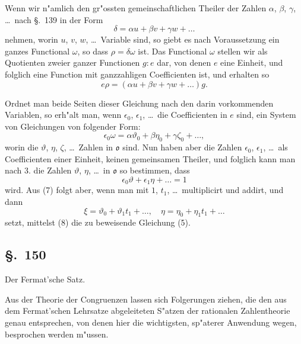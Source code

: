 \documentclass[12pt,a4paper]{article}
\theoremstyle{definition}
\begin{document}
Wenn wir n"amlich den gr"ossten gemeinschaftlichen Theiler der Zahlen $\alpha$, $\beta$, $\gamma$, \dots\ nach \S.~139 in der Form
\begin{equation}
\delta = \alpha u + \beta v + \gamma w + \dots
\end{equation}
nehmen, worin $u$, $v$, $w$, \dots\ Variable sind, so giebt es nach Voraussetzung ein ganzes Functional $\omega$, so dass $\rho = \delta\omega$ ist. Das Functional $\omega$ stellen wir als Quotienten zweier ganzer Functionen $g : e$ dar, von denen $e$ eine Einheit, und folglich eine Function mit ganzzahligen Coefficienten ist, und erhalten so
\begin{equation}
e\rho = (\alpha u + \beta v + \gamma w + \dots) g.
\end{equation}

Ordnet man beide Seiten dieser Gleichung nach den darin vorkommenden Variablen, so erh"alt man, wenn $\epsilon_0$, $\epsilon_1$, \dots\ die Coefficienten in $e$ sind, ein System von Gleichungen von folgender Form:
\begin{equation}
\epsilon_0\omega = \alpha\vartheta_0 + \beta\eta_0 + \gamma\zeta_0 + \dots,
\end{equation}
worin die $\vartheta$, $\eta$, $\zeta$, \dots\ Zahlen in $\mathfrak{o}$ sind. Nun haben aber die Zahlen $\epsilon_0$, $\epsilon_1$, \dots\ als Coefficienten einer Einheit, keinen gemeinsamen Theiler, und folglich kann man nach 3. die Zahlen $\vartheta$, $\eta$, \dots\ in $\mathfrak{o}$ so bestimmen, dass
\begin{equation}
\epsilon_0\vartheta + \epsilon_1\eta + \dots = 1
\end{equation}
wird. Aus (7) folgt aber, wenn man mit $1$, $t_1$, \dots\ multiplicirt und addirt, und dann
\begin{equation}
\xi = \vartheta_0 + \vartheta_1 t_1 + \dots, \quad \eta = \eta_0 + \eta_1 t_1 + \dots
\end{equation}
setzt, mittelst (8) die zu beweisende Gleichung (5).


\subsection*{\S.~150}

Der Fermat'sche Satz.

Aus der Theorie der Congruenzen lassen sich Folgerungen ziehen, die den aus dem Fermat'schen Lehrsatze abgeleiteten S"atzen der rationalen Zahlentheorie genau entsprechen, von denen hier die wichtigsten, sp"aterer Anwendung wegen, besprochen werden m"ussen.
\end{document}
